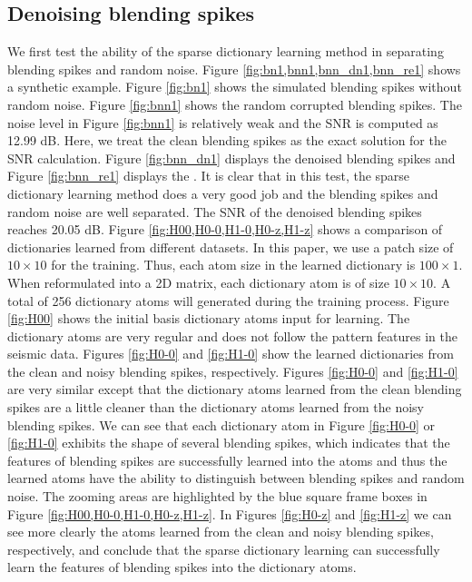 \subsection{Denoising blending spikes}
We first test the ability of the sparse dictionary learning method in separating blending spikes and random noise. Figure \ref{fig:bn1,bnn1,bnn_dn1,bnn_re1} shows a synthetic example. Figure \ref{fig:bn1} shows the simulated blending spikes without random noise. Figure \ref{fig:bnn1} shows the random  corrupted blending spikes. The noise level in Figure \ref{fig:bnn1} is relatively weak and the SNR is computed as 12.99 dB.  Here, we treat the clean blending spikes as the exact solution for the SNR calculation.  Figure \ref{fig:bnn_dn1} displays the denoised blending spikes and Figure \ref{fig:bnn_re1} displays the . It is clear that in this test, the sparse dictionary learning method does a very good job and the blending spikes and random noise are well separated.  The SNR of the denoised blending spikes reaches 20.05 dB. Figure \ref{fig:H00,H0-0,H1-0,H0-z,H1-z} shows a comparison of dictionaries learned from different datasets. In this paper, we use a patch size of $10\times10$ for the training. Thus, each atom size in the learned dictionary is $100\times 1$. When reformulated into a 2D matrix, each dictionary atom is of size $10\times10$. A total of 256 dictionary atoms will generated during the training process. Figure \ref{fig:H00} shows the initial  basis dictionary atoms input for learning. The dictionary atoms are very regular and does not follow the pattern features in the seismic data. Figures \ref{fig:H0-0} and \ref{fig:H1-0} show the learned dictionaries from the clean and noisy blending spikes, respectively. Figures \ref{fig:H0-0} and \ref{fig:H1-0} are very similar except that the dictionary atoms learned from the clean blending spikes are a little cleaner than the dictionary atoms learned from the noisy blending spikes.  We can see that each dictionary atom in Figure \ref{fig:H0-0} or \ref{fig:H1-0} exhibits the shape of several blending spikes, which indicates that the features of blending spikes are successfully learned into the atoms and thus the learned atoms have the ability to distinguish between blending spikes and random noise. The zooming areas are highlighted by the blue square frame boxes in Figure \ref{fig:H00,H0-0,H1-0,H0-z,H1-z}. In Figures \ref{fig:H0-z} and \ref{fig:H1-z} we can see more clearly the atoms learned from the clean and noisy blending spikes, respectively, and conclude that the sparse dictionary learning can successfully learn the features of blending spikes into the dictionary atoms.

